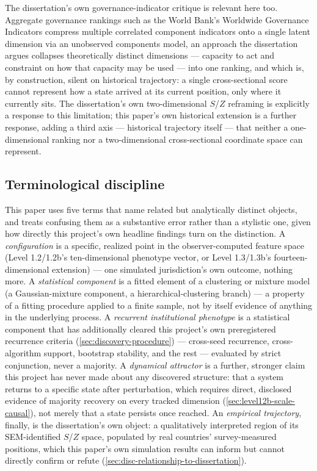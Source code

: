 The dissertation's own governance-indicator critique is relevant here too.
Aggregate governance rankings such as the World Bank's Worldwide Governance
Indicators \parencite{kaufmann2011worldwide} compress multiple correlated
component indicators onto a single latent dimension via an unobserved
components model, an approach the dissertation argues collapses
theoretically distinct dimensions --- capacity to act and constraint on
how that capacity may be used --- into one ranking, and which is, by
construction, silent on historical trajectory: a single cross-sectional
score cannot represent how a state arrived at its current position, only
where it currently sits. The dissertation's own two-dimensional $S$/$Z$
reframing is explicitly a response to this limitation; this paper's own
historical extension is a further response, adding a third
axis --- historical trajectory itself --- that neither a one-dimensional
ranking nor a two-dimensional cross-sectional coordinate space can
represent.

\subsection{Terminological discipline}
\label{sec:terminology-discipline}

This paper uses five terms that name related but analytically distinct
objects, and treats confusing them as a substantive error rather than a
stylistic one, given how directly this project's own headline findings turn
on the distinction. A \textit{configuration} is a specific, realized point
in the observer-computed feature space (Level 1.2/1.2b's ten-dimensional
phenotype vector, or Level 1.3/1.3b's fourteen-dimensional extension) ---
one simulated jurisdiction's own outcome, nothing more. A
\textit{statistical component} is a fitted element of a clustering or
mixture model (a Gaussian-mixture component, a hierarchical-clustering
branch) --- a property of a fitting procedure applied to a finite sample,
not by itself evidence of anything in the underlying process. A
\textit{recurrent institutional phenotype} is a statistical component that
has additionally cleared this project's own preregistered recurrence
criteria (\cref{sec:discovery-procedure}) --- cross-seed recurrence,
cross-algorithm support, bootstrap stability, and the rest --- evaluated
by strict conjunction, never a majority. A \textit{dynamical attractor} is
a further, stronger claim this project has never made about any discovered
structure: that a system returns to a specific state after perturbation,
which requires direct, disclosed evidence of majority recovery on every
tracked dimension (\cref{sec:level12b-scale-causal}), not merely that a
state persists once reached. An \textit{empirical trajectory}, finally, is
the dissertation's own object: a qualitatively interpreted region of its
SEM-identified $S$/$Z$ space, populated by real countries' survey-measured
positions, which this paper's own simulation results can inform but cannot
directly confirm or refute (\cref{sec:disc-relationship-to-dissertation}).

